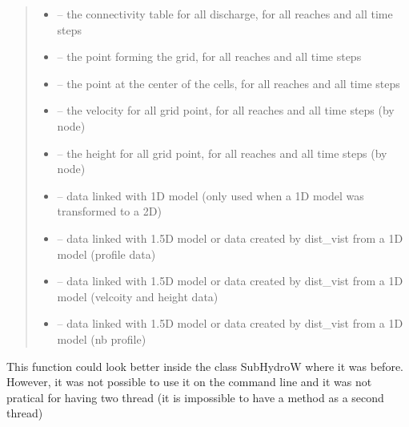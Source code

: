 \documentclass[letterpaper,10pt,english]{sphinxmanual}
\begin{document}
\begin{fulllineitems}
\begin{quote}
\begin{description}
\begin{itemize}
\item {} 
 -- the connectivity table for all discharge, for all reaches and all time steps

\item {} 
 -- the point forming the grid, for all reaches and all time steps

\item {} 
 -- the point at the center of the cells, for all reaches and all time steps

\item {} 
 -- the velocity for all grid point, for all reaches and all time steps (by node)

\item {} 
 -- the height for all grid point, for all reaches and all time steps (by node)

\item {} 
 -- data linked with 1D model (only used when a 1D model was transformed to a 2D)

\item {} 
 -- data linked with 1.5D model or data created by dist\_vist from a 1D model (profile data)

\item {} 
 -- data linked with 1.5D model or data created by dist\_vist from a 1D model (velcoity and height data)

\item {} 
 -- data linked with 1.5D model or data created by dist\_vist from a 1D model (nb profile)

\end{itemize}

\end{description}\end{quote}


This function could look better inside the class SubHydroW where it was before. However, it was not possible
to use it on the command line and it was not pratical for having two thread (it is impossible to have a method
as a second thread)


\end{fulllineitems}
\end{document}
